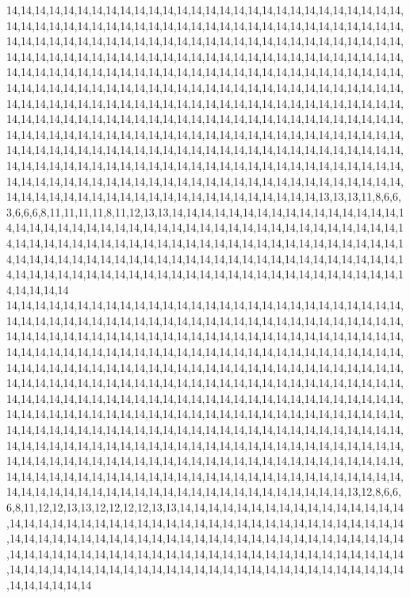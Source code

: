 14,14,14,14,14,14,14,14,14,14,14,14,14,14,14,14,14,14,14,14,14,14,14,14,14,14,14,14,14,14,14,14,14,14,14,14,14,14,14,14,14,14,14,14,14,14,14,14,14,14,14,14,14,14,14,14,14,14,14,14,14,14,14,14,14,14,14,14,14,14,14,14,14,14,14,14,14,14,14,14,14,14,14,14,14,14,14,14,14,14,14,14,14,14,14,14,14,14,14,14,14,14,14,14,14,14,14,14,14,14,14,14,14,14,14,14,14,14,14,14,14,14,14,14,14,14,14,14,14,14,14,14,14,14,14,14,14,14,14,14,14,14,14,14,14,14,14,14,14,14,14,14,14,14,14,14,14,14,14,14,14,14,14,14,14,14,14,14,14,14,14,14,14,14,14,14,14,14,14,14,14,14,14,14,14,14,14,14,14,14,14,14,14,14,14,14,14,14,14,14,14,14,14,14,14,14,14,14,14,14,14,14,14,14,14,14,14,14,14,14,14,14,14,14,14,14,14,14,14,14,14,14,14,14,14,14,14,14,14,14,14,14,14,14,14,14,14,14,14,14,14,14,14,14,14,14,14,14,14,14,14,14,14,14,14,14,14,14,14,14,14,14,14,14,14,14,14,14,14,14,14,14,14,14,14,14,14,14,14,14,14,14,14,14,14,14,14,14,14,14,14,14,14,14,14,14,14,14,14,14,14,14,14,14,14,14,14,14,14,14,14,14,14,14,14,14,14,14,14,14,14,14,14,14,14,14,14,14,14,14,14,14,14,14,14,14,14,14,14,14,14,14,14,14,14,14,14,14,13,13,13,11,8,6,6,3,6,6,6,8,11,11,11,11,8,11,12,13,13,14,14,14,14,14,14,14,14,14,14,14,14,14,14,14,14,14,14,14,14,14,14,14,14,14,14,14,14,14,14,14,14,14,14,14,14,14,14,14,14,14,14,14,14,14,14,14,14,14,14,14,14,14,14,14,14,14,14,14,14,14,14,14,14,14,14,14,14,14,14,14,14,14,14,14,14,14,14,14,14,14,14,14,14,14,14,14,14,14,14,14,14,14,14,14,14,14,14,14,14,14,14,14,14,14,14,14,14,14,14,14,14,14,14,14,14,14,14,14,14,14,14,14,14,14,14,14,14,14,14,14,14,14
14,14,14,14,14,14,14,14,14,14,14,14,14,14,14,14,14,14,14,14,14,14,14,14,14,14,14,14,14,14,14,14,14,14,14,14,14,14,14,14,14,14,14,14,14,14,14,14,14,14,14,14,14,14,14,14,14,14,14,14,14,14,14,14,14,14,14,14,14,14,14,14,14,14,14,14,14,14,14,14,14,14,14,14,14,14,14,14,14,14,14,14,14,14,14,14,14,14,14,14,14,14,14,14,14,14,14,14,14,14,14,14,14,14,14,14,14,14,14,14,14,14,14,14,14,14,14,14,14,14,14,14,14,14,14,14,14,14,14,14,14,14,14,14,14,14,14,14,14,14,14,14,14,14,14,14,14,14,14,14,14,14,14,14,14,14,14,14,14,14,14,14,14,14,14,14,14,14,14,14,14,14,14,14,14,14,14,14,14,14,14,14,14,14,14,14,14,14,14,14,14,14,14,14,14,14,14,14,14,14,14,14,14,14,14,14,14,14,14,14,14,14,14,14,14,14,14,14,14,14,14,14,14,14,14,14,14,14,14,14,14,14,14,14,14,14,14,14,14,14,14,14,14,14,14,14,14,14,14,14,14,14,14,14,14,14,14,14,14,14,14,14,14,14,14,14,14,14,14,14,14,14,14,14,14,14,14,14,14,14,14,14,14,14,14,14,14,14,14,14,14,14,14,14,14,14,14,14,14,14,14,14,14,14,14,14,14,14,14,14,14,14,14,14,14,14,14,14,14,14,14,14,14,14,14,14,14,14,14,14,14,14,14,14,14,14,14,14,14,14,14,14,14,14,14,14,14,14,14,14,13,12,8,6,6,6,8,11,12,12,13,13,12,12,12,12,13,13,14,14,14,14,14,14,14,14,14,14,14,14,14,14,14,14,14,14,14,14,14,14,14,14,14,14,14,14,14,14,14,14,14,14,14,14,14,14,14,14,14,14,14,14,14,14,14,14,14,14,14,14,14,14,14,14,14,14,14,14,14,14,14,14,14,14,14,14,14,14,14,14,14,14,14,14,14,14,14,14,14,14,14,14,14,14,14,14,14,14,14,14,14,14,14,14,14,14,14,14,14,14,14,14,14,14,14,14,14,14,14,14,14,14,14,14,14,14,14,14,14,14,14,14,14,14,14,14,14,14,14,14,14,14
